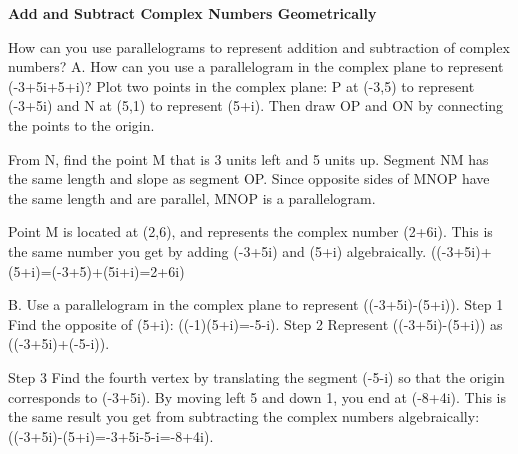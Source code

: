 \documentclass{article}
\newenvironment{example}[1]{}{}         %
\newcommand{\answer}[1]{}               %
\newcommand{\placeholder}[2]{}          %
\newcommand{\te}[1]{}                   %
\begin{document}
\begin{example}{4}
\textbf{Add and Subtract Complex Numbers Geometrically}
\te{CONCEPTUAL UNDERSTANDING}
How can you use parallelograms to represent addition and subtraction of complex numbers?
A. How can you use a parallelogram in the complex plane to represent (-3+5i+5+i)?
Plot two points in the complex plane: P at (-3,5) to represent (-3+5i) and N at (5,1) to represent (5+i). Then draw OP and ON by connecting the points to the origin.
\placeholder{graph}{Unit complex grid real [-5,6], imaginary [-3,7], black double-arrowed R horizontal and i vertical axes, O origin. Real labels -4,-2,2,4; imaginary -2,2,4,6. Red filled origin and P(-3,5), red segment OP; blue filled N(5,1) with blue segment ON.}
\te{CONTINUED ON THE NEXT PAGE.}
From N, find the point M that is 3 units left and 5 units up. Segment NM has the same length and slope as segment OP. Since opposite sides of MNOP have the same length and are parallel, MNOP is a parallelogram.
\placeholder{graph}{Unit complex grid real [-5,6], imaginary [-3,7], double-arrowed R and i axes, O origin; real labels -4,-2,2,4, imaginary -2,2,4,6. Filled O(0,0), P(-3,5), N(5,1), M(2,6). Solid red OP and blue ON; dashed red NM and dashed blue PM complete parallelogram.}
\te{Callout: P is 3 units left and 5 units up from the origin.}
Point M is located at (2,6), and represents the complex number (2+6i). This is the same number you get by adding (-3+5i) and (5+i) algebraically.
((-3+5i)+(5+i)=(-3+5)+(5i+i)=2+6i)
\answer{A. (2+6i)}
B. Use a parallelogram in the complex plane to represent ((-3+5i)-(5+i)).
Step 1 Find the opposite of (5+i): ((-1)(5+i)=-5-i).
Step 2 Represent ((-3+5i)-(5+i)) as ((-3+5i)+(-5-i)).
\placeholder{graph}{Unit complex grid, real [-10,6], imaginary [-4,8], double-arrowed R and i axes, O origin; real labels -8,-6,-4,-2,2,4, imaginary -2,2,4,6. Red filled points O,(-3,5),(5,1),(-5,-1),(-8,4); labels -3+5i red, 5+i blue, -5-i green, -8+4i black. Red segment O to (-3,5), blue O to (5,1), green O to (-5,-1); dashed black sides join (-3,5) to (-8,4) to (-5,-1).}
\te{Callout: Draw the parallelogram and find the complex number for the fourth vertex.}
\te{Callout: Graph -5-i, the opposite of the original complex number 5+i.}
Step 3 Find the fourth vertex by translating the segment (-5-i) so that the origin corresponds to (-3+5i). By moving left 5 and down 1, you end at (-8+4i).
This is the same result you get from subtracting the complex numbers algebraically: ((-3+5i)-(5+i)=-3+5i-5-i=-8+4i).
\te{STUDY TIP Just as with real numbers, subtracting is the same as adding the opposite. Therefore, when subtracting two complex numbers geometrically, draw the opposite of the subtrahend and add.}
\answer{B. (-8+4i)}
\end{example}
\end{document}
